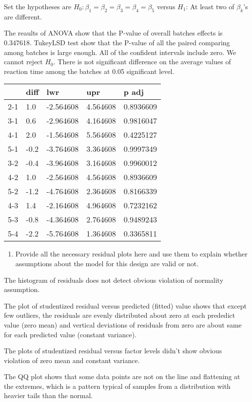 \documentclass[]{article}
\providecommand{\tightlist}{%
  \setlength{\itemsep}{0pt}\setlength{\parskip}{0pt}}
\begin{document}
Set the hypotheses are \(H_0: \beta_1=\beta_2=\beta_3=\beta_4=\beta_5\)
versus \(H_1\): At least two of \(\beta_k\)'s are different.

The reaults of ANOVA show that the P-value of overall batches effects is
0.347618. TukeyLSD test show that the P-value of all the paired
comparing among batches is large enough. All of the confident intervals
include zero. We cannot reject \(H_0\). There is not significant
difference on the average values of reaction time among the batches at
0.05 significant level.

\begin{longtable}[]{@{}lllll@{}}
\toprule
& diff & lwr & upr & p adj\tabularnewline
\midrule
\endhead
2-1 & 1.0 & -2.564608 & 4.564608 & 0.8936609\tabularnewline
3-1 & 0.6 & -2.964608 & 4.164608 & 0.9816047\tabularnewline
4-1 & 2.0 & -1.564608 & 5.564608 & 0.4225127\tabularnewline
5-1 & -0.2 & -3.764608 & 3.364608 & 0.9997349\tabularnewline
3-2 & -0.4 & -3.964608 & 3.164608 & 0.9960012\tabularnewline
4-2 & 1.0 & -2.564608 & 4.564608 & 0.8936609\tabularnewline
5-2 & -1.2 & -4.764608 & 2.364608 & 0.8166339\tabularnewline
4-3 & 1.4 & -2.164608 & 4.964608 & 0.7232162\tabularnewline
5-3 & -0.8 & -4.364608 & 2.764608 & 0.9489243\tabularnewline
5-4 & -2.2 & -5.764608 & 1.364608 & 0.3365811\tabularnewline
\bottomrule
\end{longtable}

\begin{enumerate}
\def\labelenumi{(\alph{enumi})}
\setcounter{enumi}{4}
\tightlist
\item
  Provide all the necessary residual plots here and use them to explain
  whether assumptions about the model for this design are valid or not.
\end{enumerate}

The histogram of residuals does not detect obvious violation of
normality assumption.

The plot of studentized residual versus predicted (fitted) value shows
that except few outliers, the residuals are evenly distributed about
zero at each prededict value (zero mean) and vertical deviations of
residuals from zero are about same for each predicted value (constant
variance).

The plots of studentized residual versus factor levels didn't show
obvious violation of zero mean and constant variance.

The QQ plot shows that some data points are not on the line and
flattening at the extremes, which is a pattern typical of samples from a
distribution with heavier tails than the normal.
\end{document}
